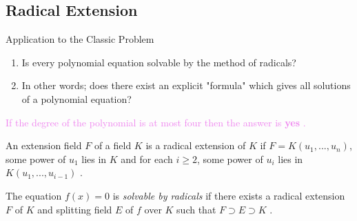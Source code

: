 \documentclass{beamer}
\begin{document}
\subsection{Radical Extension}
\begin{frame}{Application to the Classic Problem}
  \begin{tcolorbox}[colback=white, colframe=red, boxsep=1mm, title={\bfseries \color{white} Question:}]

    \begin{enumerate}
    \item Is every polynomial equation solvable by the method of radicals?
    \item In other words; does there exist an explicit "formula" which gives all solutions of a polynomial equation?
    \end{enumerate}
  \end{tcolorbox}


\textcolor{violet}{If the degree of the polynomial is at most four then the answer is \textbf{yes} \cite{hunger}.}
\vspace{7mm}
\begin{definition}
  An extension field \(F\) of a field \(K\) is a radical extension of \(K\) if \(F=K(u_1,...,u_n)\), some power of \(u_1\) lies in \(K\) and for each \(i \geq 2\), some power of \(u_i\) lies in \(K(u_1,...,u_{i-1})\) \cite{hunger}.
\end{definition}
\vspace{4mm}
\textcolor{green!50!black}{The equation \(f(x)=0\) is \textit{solvable by radicals} if there exists a radical extension} \(F\) of \(K\) and splitting field \(E\) of \(f\) over \(K\) such that \(F \supset E \supset K\) \cite{hunger}.
\end{frame}
\end{document}
